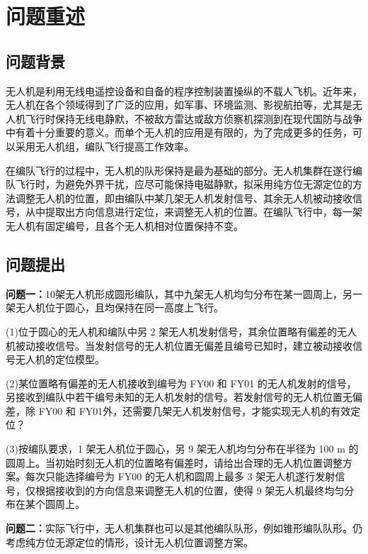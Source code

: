 \documentclass{cumcmthesis}
\begin{document}


 \section{问题重述}
 \subsection{问题背景}
 无人机是利用无线电遥控设备和自备的程序控制装置操纵的不载人飞机。近年来，无人机在各个领域得到了广泛的应用，如军事、环境监测、影视航拍\cite{22}等，尤其是无人机飞行时保持无线电静默，不被敌方雷达或敌方侦察机探测到在现代国防与战争中有着十分重要的意义。而单个无人机的应用是有限的，为了完成更多的任务，可以采用无人机组，编队飞行提高工作效率。
 
 在编队飞行的过程中，无人机的队形保持\cite{11}是最为基础的部分。无人机集群在遂行编队飞行时，为避免外界干扰，应尽可能保持电磁静默，拟采用纯方位无源定位的方法调整无人机的位置，即由编队中某几架无人机发射信号、其余无人机被动接收信号，从中提取出方向信息进行定位，来调整无人机的位置。在编队飞行中，每一架无人机有固定编号，且各个无人机相对位置保持不变。
\subsection{问题提出}
\textbf{问题一：}10架无人机形成圆形编队，其中九架无人机均匀分布在某一圆周上，另一架无人机位于圆心，且均保持在同一高度上飞行。

(1)位于圆心的无人机和编队中另 2 架无人机发射信号，其余位置略有偏差的无人机被动接收信号。当发射信号的无人机位置无偏差且编号已知时，建立被动接收信号无人机的定位模型。

(2)某位置略有偏差的无人机接收到编号为 FY00 和 FY01 的无人机发射的信号，另接收到编队中若干编号未知的无人机发射的信号。若发射信号的无人机位置无偏差，除 FY00 和 FY01外，还需要几架无人机发射信号，才能实现无人机的有效定位？

(3)按编队要求，1 架无人机位于圆心，另 9 架无人机均匀分布在半径为 100 m 的圆周上。当初始时刻无人机的位置略有偏差时，请给出合理的无人机位置调整方案。每次只能选择编号为 FY00 的无人机和圆周上最多 3 架无人机遂行发射信号，仅根据接收到的方向信息来调整无人机的位置，使得 9 架无人机最终均匀分布在某个圆周上。

\textbf{问题二：}实际飞行中，无人机集群也可以是其他编队队形，例如锥形编队队形。仍考虑纯方位无源定位的情形，设计无人机位置调整方案。
\end{document}

